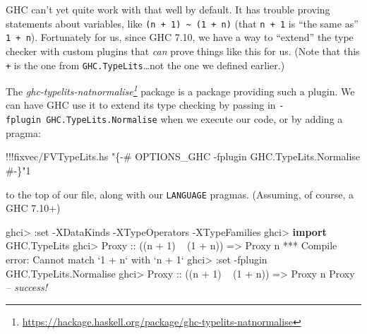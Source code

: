 \documentclass[]{article}
\newenvironment{Shaded}{}{}
\newcommand{\KeywordTok}[1]{\textcolor[rgb]{0.00,0.44,0.13}{\textbf{{#1}}}}
\newcommand{\DataTypeTok}[1]{\textcolor[rgb]{0.56,0.13,0.00}{{#1}}}
\newcommand{\DecValTok}[1]{\textcolor[rgb]{0.25,0.63,0.44}{{#1}}}
\newcommand{\StringTok}[1]{\textcolor[rgb]{0.25,0.44,0.63}{{#1}}}
\newcommand{\CommentTok}[1]{\textcolor[rgb]{0.38,0.63,0.69}{\textit{{#1}}}}
\newcommand{\OtherTok}[1]{\textcolor[rgb]{0.00,0.44,0.13}{{#1}}}
\newcommand{\FunctionTok}[1]{\textcolor[rgb]{0.02,0.16,0.49}{{#1}}}
\newcommand{\NormalTok}[1]{{#1}}
\renewcommand{\href}[2]{#2\footnote{\url{#1}}}
\begin{document}
GHC can't yet quite work with that well by default. It has trouble
proving statements about variables, like
\texttt{(n\ +\ 1)\ \textasciitilde{}\ (1\ +\ n)} (that \texttt{n\ +\ 1}
is ``the same as'' \texttt{1\ +\ n}). Fortunately for us, since GHC
7.10, we have a way to ``extend'' the type checker with custom plugins
that \emph{can} prove things like this for us. (Note that this
\texttt{+} is the one from \texttt{GHC.TypeLits}\ldots{}not the one we
defined earlier.)

The
\emph{\href{https://hackage.haskell.org/package/ghc-typelits-natnormalise}{ghc-typelits-natnormalise}}
package is a package providing such a plugin. We can have GHC use it to
extend its type checking by passing in
\texttt{-fplugin\ GHC.TypeLits.Normalise} when we execute our code, or
by adding a pragma:

\begin{Shaded}
\begin{Highlighting}[]
\FunctionTok{!!!}\NormalTok{fixvec}\FunctionTok{/}\NormalTok{FVTypeLits.hs }\StringTok{"\{-# OPTIONS_GHC -fplugin GHC.TypeLits.Normalise #-\}"}\DecValTok{1}
\end{Highlighting}
\end{Shaded}

to the top of our file, along with our \texttt{LANGUAGE} pragmas.
(Assuming, of course, a GHC 7.10+)

\begin{Shaded}
\begin{Highlighting}[]
\NormalTok{ghci}\FunctionTok{>} \FunctionTok{:}\NormalTok{set }\FunctionTok{-}\DataTypeTok{XDataKinds} \FunctionTok{-}\DataTypeTok{XTypeOperators} \FunctionTok{-}\DataTypeTok{XTypeFamilies}
\NormalTok{ghci}\FunctionTok{>} \KeywordTok{import }\DataTypeTok{GHC.TypeLits}
\NormalTok{ghci}\FunctionTok{>} \DataTypeTok{Proxy}\OtherTok{ ::} \NormalTok{((n }\FunctionTok{+} \DecValTok{1}\NormalTok{) }\FunctionTok{~} \NormalTok{(}\DecValTok{1} \FunctionTok{+} \NormalTok{n)) }\OtherTok{=>} \DataTypeTok{Proxy} \NormalTok{n}
\FunctionTok{***} \DataTypeTok{Compile} \NormalTok{error}\FunctionTok{:} \DataTypeTok{Cannot} \NormalTok{match }\OtherTok{`1 + n`} \NormalTok{with }\OtherTok{`n + 1`}
\NormalTok{ghci}\FunctionTok{>} \FunctionTok{:}\NormalTok{set }\FunctionTok{-}\NormalTok{fplugin }\DataTypeTok{GHC.TypeLits.Normalise}
\NormalTok{ghci}\FunctionTok{>} \DataTypeTok{Proxy}\OtherTok{ ::} \NormalTok{((n }\FunctionTok{+} \DecValTok{1}\NormalTok{) }\FunctionTok{~} \NormalTok{(}\DecValTok{1} \FunctionTok{+} \NormalTok{n)) }\OtherTok{=>} \DataTypeTok{Proxy} \NormalTok{n}
\DataTypeTok{Proxy}   \CommentTok{-- success!}
\end{Highlighting}
\end{Shaded}
\end{document}
